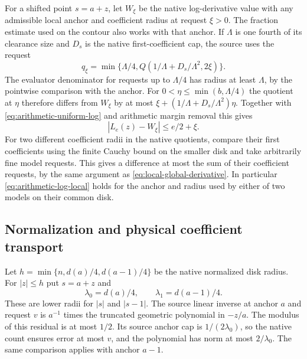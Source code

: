 \documentclass[11pt]{amsart}
\theoremstyle{definition}
\theoremstyle{remark}
\numberwithin{equation}{section}
\begin{document}
For a shifted point $s=a+z$, let $W_\xi$ be the native
log-derivative value with any admissible local anchor
and coefficient radius at request $\xi>0$.
The fraction estimate used on the contour also works
with that anchor. If $\Lambda$ is one fourth of its
clearance size and $D_s$ is the native first-coefficient
cap, the source uses the request
\[
         q_\xi=\min\{\Lambda/4,Q(1/\Lambda+D_s/\Lambda^2,2\xi)\}.
\]
The evaluator denominator for requests up to $\Lambda/4$
has radius at least $\Lambda$, by the pointwise
comparison with the anchor. For $0<\eta\le\min(b,\Lambda/4)$
the quotient at $\eta$ therefore differs from $W_\xi$
by at most $\xi+(1/\Lambda+D_s/\Lambda^2)\eta$.
Together with \eqref{eq:arithmetic-uniform-log} and
arithmetic margin removal this gives
\begin{equation}\label{eq:arithmetic-log-local}
                       |L_e(z)-W_\xi|\le e/2+\xi.
\end{equation}
For two different coefficient radii in the native
quotients, compare their first coefficients using the
finite Cauchy bound on the smaller disk and take
arbitrarily fine model requests. This gives a difference
at most the sum of their coefficient requests, by
the same argument as \eqref{eq:local-global-derivative}.
In particular \eqref{eq:arithmetic-log-local} holds
for the anchor and radius used by either of two models
on their common disk.

\subsection{Normalization and physical coefficient transport}

Let $h=\min\{n,d(a)/4,d(a-1)/4\}$ be the native normalized
disk radius. For $|z|\le h$ put $s=a+z$ and
\[
    \lambda_0=d(a)/4,\qquad \lambda_1=d(a-1)/4 .
\]
These are lower radii for $|s|$ and $|s-1|$.
The source linear inverse at anchor $a$ and request $v$
is $a^{-1}$ times the truncated geometric polynomial
in $-z/a$. The modulus of this residual is at most
$1/2$. Its source anchor cap is $1/(2\lambda_0)$,
so the native count ensures error at most $v$, and
the polynomial has norm at most $2/\lambda_0$.
The same comparison applies with anchor $a-1$.
\end{document}
